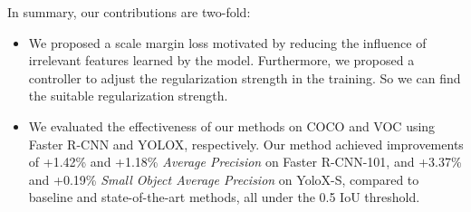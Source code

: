 \documentclass{article}
\begin{document}




In summary, our contributions are two-fold:

\begin{itemize}
    \item We proposed a scale margin loss motivated by reducing the influence of irrelevant features learned by the model. Furthermore, we proposed a controller to adjust the regularization strength in the training. So we can find the suitable regularization strength.
    \item We evaluated the effectiveness of our methods on COCO and VOC using Faster R-CNN and YOLOX, respectively. Our method achieved improvements of +1.42\% and +1.18\% \textit{Average Precision} on Faster R-CNN-101, and +3.37\% and +0.19\% \textit{Small Object Average Precision} on YoloX-S, compared to baseline and state-of-the-art methods, all under the 0.5 IoU threshold.
\end{itemize}
\end{document}
